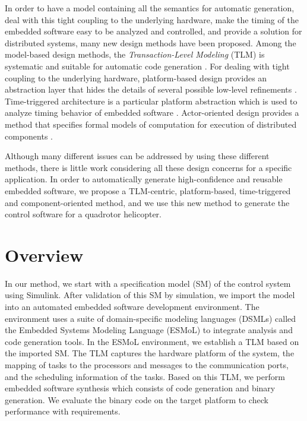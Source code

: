 \documentclass[10pt, conference, compsocconf]{IEEEtran}
\begin{document}
In order to have a model containing all the semantics for automatic generation, deal with this tight coupling to the underlying hardware, make the timing of the embedded software easy to be analyzed and controlled, and provide a solution for distributed systems, many new design methods have been proposed. Among the model-based design methods, the \emph{Transaction-Level Modeling} (TLM) is systematic and suitable for automatic code generation \cite{modeling:embedded}\cite{modeling:tlm}. For dealing with tight coupling to the underlying hardware, platform-based design provides an abstraction layer that hides the details of several possible low-level refinements \cite{modeling:platform}. Time-triggered architecture is a particular platform abstraction which is used to analyze timing behavior of embedded software \cite{modeling:giotto3}. Actor-oriented design provides a method that specifies formal models of computation for execution of distributed components \cite{embedded:software}.

Although many different issues can be addressed by using these different methods, there is little work considering all these design concerns for a specific application. In order to automatically generate high-confidence and reusable embedded software, we propose a TLM-centric, platform-based, time-triggered and component-oriented method, and we use this new method to generate the control software for a quadrotor helicopter.


\section{Overview}

In our method, we start with a specification model (SM) of the control system using Simulink. After validation of this SM by simulation, we import the model into an automated embedded software development environment. The environment uses a suite of domain-specific modeling languages (DSMLs) called the Embedded Systems Modeling Language (ESMoL) to integrate analysis and code generation tools. In the ESMoL environment, we establish a TLM based on the imported SM. The TLM captures the hardware platform of the system, the mapping of tasks to the processors and messages to the communication ports, and the scheduling information of the tasks. Based on this TLM, we perform embedded software synthesis which consists of code generation and binary generation. We evaluate the binary code on the target platform to check performance with requirements.
\end{document}

